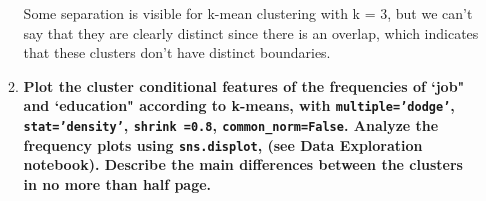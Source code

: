 \documentclass[12pt]{article}
\begin{document}
\begin{enumerate}
\begin{enumerate}[label=\alph*)]
        \vspace{10pt}
        Some separation is visible for k-mean clustering with k = 3, but we can't say that they are clearly distinct since there is an overlap, which indicates that these clusters don't have distinct boundaries.
        \vspace{10pt}
        
        \item \textbf{Plot the cluster conditional features of the frequencies of `job" and `education"
        according to k-means, with \texttt{multiple='dodge'}, \texttt{stat='density'},
        \texttt{shrink =0.8}, \texttt{common\_norm=False}. Analyze the frequency plots using \texttt{sns.displot}, (see Data Exploration
        notebook). Describe the main diﬀerences between the clusters in no more than half page.}

        \vspace{10pt}
        


\end{enumerate}
\end{enumerate}
\end{document}
